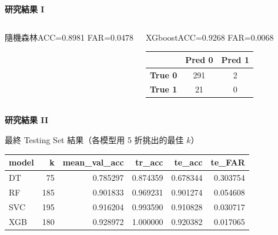 \documentclass[12pt,aspectratio=43]{beamer}
\begin{document}
\begin{frame}{\textbf{研究結果 I}}
\begin{columns}[T, onlytextwidth]
\begin{block}{隨機森林}{ACC=0.8981 FAR=0.0478}
  \end{block}

  \begin{block}{XGboost}{ACC=0.9268 FAR=0.0068}
  {\footnotesize
  \setlength{\tabcolsep}{5pt}\renewcommand{\arraystretch}{1.15}
  \begin{tabular}{c|cc}
           & \textbf{Pred 0} & \textbf{Pred 1} \\ \hline
  \textbf{True 0} & 291 & 2 \\
  \textbf{True 1} & 21  & 0  \\
  \end{tabular}}
  \end{block}

\end{columns}

\end{frame}


\begin{frame}{\textbf{研究結果 II}}
	
\small
\setlength{\tabcolsep}{6pt}
\renewcommand{\arraystretch}{1.2}

\begin{block}{最終 Testing Set 結果（各模型用 5 折挑出的最佳 $k$）}
\begin{tabular}{l r r r r r}
\textbf{model} & \textbf{k} & \textbf{mean\_val\_acc} &
\textbf{tr\_acc} & \textbf{te\_acc} & \textbf{te\_FAR} \\
\hline
DT  &  75 & 0.785297 & 0.874359 & 0.678344 & 0.303754 \\
RF  & 185 & 0.901833 & 0.969231 & 0.901274 & 0.054608 \\
SVC & 195 & 0.916204 & 0.993590 & 0.910828 & 0.030717 \\
XGB & 180 & 0.928972 & 1.000000 & 0.920382 & 0.017065 \\
\end{tabular}
\end{block}

\end{frame}
\end{document}
